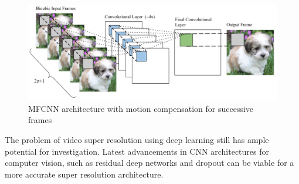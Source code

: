 \documentclass[10pt]{article}
\begin{document}
\begin{figure}[H]
	\centering
	\includegraphics[scale=0.3]{figs/videoCNN.PNG}
	\caption{MFCNN architecture with motion compensation for successive frames}
	\label{fig:2}
\end{figure}

\noindent
The problem of video super resolution using deep learning still has ample potential for investigation. Latest advancements in CNN architectures for computer vision, such as residual deep networks \cite{he2016deep} and dropout can be viable for a more accurate super resolution architecture. 
\end{document}
